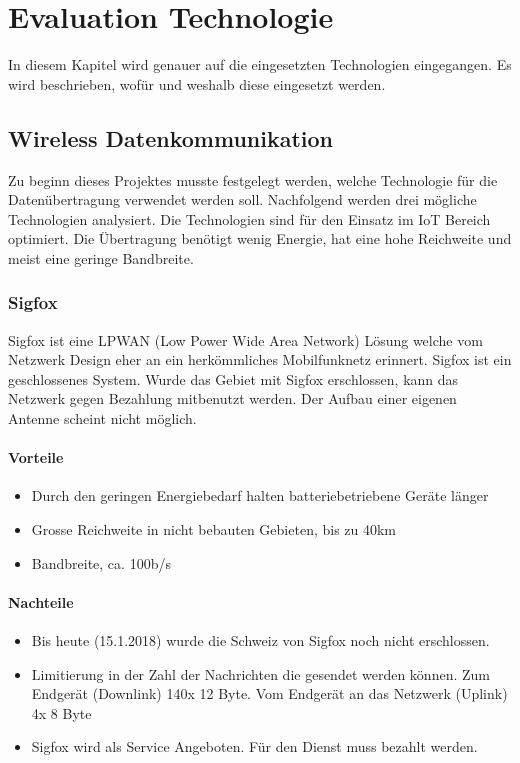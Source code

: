 \documentclass[11pt,english,german]{report}
\theoremstyle{definition}
\begin{document}
\chapter{Evaluation Technologie}
In diesem Kapitel wird genauer auf die eingesetzten Technologien eingegangen. Es wird beschrieben, wofür und weshalb diese eingesetzt werden. 

\section{Wireless Datenkommunikation}
Zu beginn dieses Projektes musste festgelegt werden, welche Technologie für die Datenübertragung verwendet werden soll. Nachfolgend werden drei mögliche Technologien analysiert. Die Technologien sind für den Einsatz im IoT Bereich optimiert. Die Übertragung benötigt wenig Energie, hat eine hohe Reichweite und meist eine geringe Bandbreite.

\subsection{Sigfox}
Sigfox ist eine \gls{LPWAN} (Low Power Wide Area Network) Lösung welche vom Netzwerk Design eher an ein herkömmliches Mobilfunknetz erinnert. Sigfox ist ein geschlossenes System. Wurde das Gebiet mit Sigfox erschlossen, kann das Netzwerk gegen Bezahlung mitbenutzt werden. Der Aufbau einer eigenen Antenne scheint nicht möglich. 

\subsubsection{Vorteile}
\begin{itemize}
	\item Durch den geringen Energiebedarf halten batteriebetriebene Geräte länger
	\item Grosse Reichweite in nicht bebauten Gebieten, bis zu 40km
	\item Bandbreite, ca. 100b/s
\end{itemize}
\subsubsection{Nachteile}
\begin{itemize}
	\item Bis heute (15.1.2018) wurde die Schweiz von Sigfox noch nicht erschlossen.
	\item Limitierung in der Zahl der Nachrichten die gesendet werden können. Zum Endgerät (Downlink) 140x 12 Byte. Vom Endgerät an das Netzwerk (Uplink) 4x 8 Byte
	\item Sigfox wird als Service Angeboten. Für den Dienst muss bezahlt werden.
\end{itemize}
\end{document}
